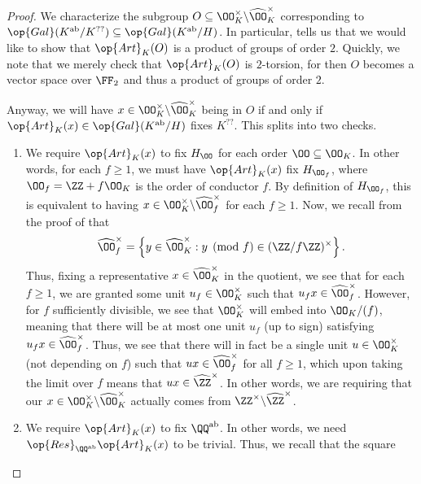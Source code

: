 \documentclass[../notes.tex]{subfiles}
\begin{document}
\begin{proof}
	We characterize the subgroup $O\subseteq\OO_K^\times\backslash\widehat\OO_K^\times$ corresponding to $\op{Gal}(K^{\mathrm{ab}}/K^{??})\subseteq\op{Gal}(K^{\mathrm{ab}}/H)$. In particular,  tells us that we would like to show that $\op{Art}_K(O)$ is a product of groups of order $2$. Quickly, we note that we merely check that $\op{Art}_K(O)$ is $2$-torsion, for then $O$ becomes a vector space over $\FF_2$ and thus a product of groups of order $2$.
	
	Anyway, we will have $x\in\OO_K^\times\backslash\widehat\OO_K^\times$ being in $O$ if and only if $\op{Art}_K(x)\in\op{Gal}(K^{\mathrm{ab}}/H)$ fixes $K^{??}$. This splits into two checks.
	\begin{enumerate}
		\item We require $\op{Art}_K(x)$ to fix $H_\OO$ for each order $\OO\subseteq\OO_K$. In other words, for each $f\ge1$, we must have $\op{Art}_K(x)$ fix $H_{\OO_f}$, where $\OO_f=\ZZ+f\OO_K$ is the order of conductor $f$. By definition of $H_{\OO_f}$, this is equivalent to having $x\in\OO_K^\times\backslash\widehat\OO_f^\times$ for each $f\ge1$. Now, we recall from the proof of  that
		\[\widehat\OO_f^\times=\left\{y\in\widehat\OO_K^\times:y\pmod f\in(\ZZ/f\ZZ)^\times\right\}.\]
		Thus, fixing a representative $x\in\widehat\OO_K^\times$ in the quotient, we see that for each $f\ge1$, we are granted some unit $u_f\in\OO_K^\times$ such that $u_fx\in\widehat\OO_f^\times$. However, for $f$ sufficiently divisible, we see that $\OO_K^\times$ will embed into $\OO_K/(f)$, meaning that there will be at most one unit $u_f$ (up to sign) satisfying $u_fx\in\widehat\OO_f^\times$. Thus, we see that there will in fact be a single unit $u\in\OO_K^\times$ (not depending on $f$) such that $ux\in\widehat\OO_f^\times$ for all $f\ge1$, which upon taking the limit over $f$ means that $ux\in\widehat\ZZ^\times$. In other words, we are requiring that our $x\in\OO_K^\times\backslash\widehat\OO_K^\times$ actually comes from $\ZZ^\times\backslash\widehat\ZZ^\times$.
		\item We require $\op{Art}_K(x)$ to fix $\QQ^{\mathrm{ab}}$. In other words, we need $\op{Res}_{\QQ^{\mathrm{ab}}}\op{Art}_K(x)$ to be trivial. Thus, we recall that the square

\end{enumerate}
\end{proof}
\end{document}
